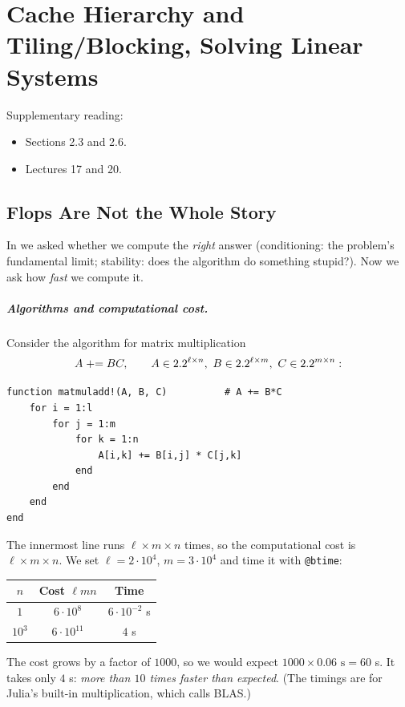 \chapter{Cache Hierarchy and Tiling/Blocking, Solving Linear Systems}
\label{ch:performance}

Supplementary reading:
\begin{itemize}
  \item \cite{Demmel} Sections 2.3 and 2.6.
  \item \cite{TB} Lectures 17 and 20.
\end{itemize}

\section{Flops Are Not the Whole Story}

In  we asked whether we compute the \emph{right} answer (conditioning: the problem's fundamental limit; stability: does the algorithm do something stupid?). Now we ask how \emph{fast} we compute it.

\paragraph{Algorithms and computational cost.} Consider the algorithm for matrix multiplication
\begin{equation}
  A \mathrel{+}= BC, \qquad A \in 2.2^{\ell \times n},\ B \in 2.2^{\ell \times m},\ C \in 2.2^{m \times n}:
\end{equation}
\begin{lstlisting}
function matmuladd!(A, B, C)          # A += B*C
    for i = 1:l
        for j = 1:m
            for k = 1:n
                A[i,k] += B[i,j] * C[j,k]
            end
        end
    end
end
\end{lstlisting}
The innermost line runs $\ell \times m \times n$ times, so the computational cost is $\ell \times m \times n$. We set $\ell = 2 \cdot 10^4$, $m = 3 \cdot 10^4$ and time it with \texttt{@btime}:
\begin{center}
\begin{tabular}{ccc}
  \toprule
  $n$ & Cost $\ell mn$ & Time \\
  \midrule
  $1$ & $6 \cdot 10^8$ & $6 \cdot 10^{-2}$ s \\
  $10^3$ & $6 \cdot 10^{11}$ & $4$ s \\
  \bottomrule
\end{tabular}
\end{center}
The cost grows by a factor of $1000$, so we would expect $1000 \times 0.06\text{ s} = 60$ s. It takes only $4$ s: \emph{more than $10$ times faster than expected}. (The timings are for Julia's built-in multiplication, which calls BLAS.)

